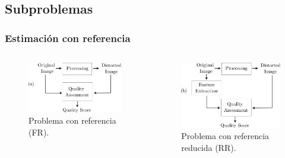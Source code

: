 \subsection{Subproblemas}
\begin{frame}
  \frametitle{Estimación con referencia}
  \begin{columns}
    \begin{figure}
    \includegraphics[width=\textwidth]{imagenes/chapter1/FullReferenceInk.png}
    \caption{Problema con referencia (FR).}
    \end{figure}
    \begin{figure}
    \includegraphics[width=\textwidth]{imagenes/chapter1/ReducedReferenceInk.png}
    \caption{Problema con referencia reducida (RR).}
    \end{figure}
  \end{columns}
\end{frame}

